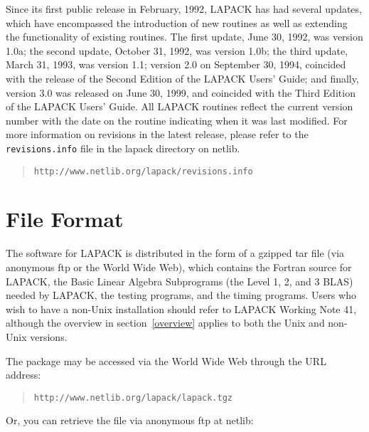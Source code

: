 \dent
Since its first public release in February, 1992, LAPACK has had
several updates, which have encompassed the introduction of new routines
as well as extending the functionality of existing routines.  The first
update,
June 30, 1992, was version 1.0a; the second update, October 31, 1992,
was version 1.0b; the third update, March 31, 1993, was version 1.1;
version 2.0 on September 30, 1994, coincided with the release of the
Second Edition of the LAPACK Users' Guide; and finally, version 3.0 was
released on June 30, 1999, and coincided with the Third Edition of
the LAPACK Users' Guide.
All LAPACK routines reflect the current version number with the date
on the routine indicating when it was last modified.
For more information on revisions in the latest release, please refer
to the {\tt revisions.info} file in the lapack directory on netlib.
\begin{quote}
{\tt http://www.netlib.org/lapack/revisions.info}
\end{quote}

%

\section{File Format}\label{fileformat}

\dent
The software for LAPACK is distributed in the form of a
gzipped tar file (via anonymous ftp or the World Wide Web),
which contains the Fortran source for LAPACK,
the Basic Linear Algebra Subprograms
(the Level 1, 2, and 3 BLAS) needed by LAPACK, the testing programs,
and the timing programs.
Users who wish to have a non-Unix installation should refer to LAPACK
Working Note 41,
although the overview in section~\ref{overview} applies to both the Unix and non-Unix
versions.

The package may be accessed via the World Wide Web through
the URL address:
\begin{quote}
{\tt http://www.netlib.org/lapack/lapack.tgz}
\end{quote}

Or, you can retrieve the file via anonymous ftp at netlib:

